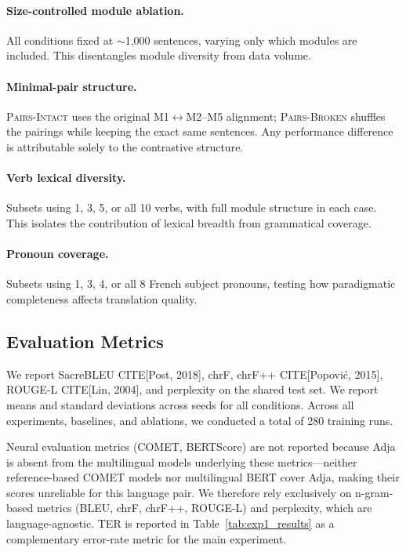 \documentclass[11pt]{article}
\begin{document}
\paragraph{Size-controlled module ablation.} All conditions fixed at ${\sim}$1,000 sentences, varying only which modules are included. This disentangles module diversity from data volume.

\paragraph{Minimal-pair structure.} \textsc{Pairs-Intact} uses the original M1$\leftrightarrow$M2--M5 alignment; \textsc{Pairs-Broken} shuffles the pairings while keeping the exact same sentences. Any performance difference is attributable solely to the contrastive structure.

\paragraph{Verb lexical diversity.} Subsets using 1, 3, 5, or all 10 verbs, with full module structure in each case. This isolates the contribution of lexical breadth from grammatical coverage.

\paragraph{Pronoun coverage.} Subsets using 1, 3, 4, or all 8 French subject pronouns, testing how paradigmatic completeness affects translation quality.

\subsection{Evaluation Metrics}

We report SacreBLEU CITE[Post, 2018], chrF, chrF++ CITE[Popovi\'{c}, 2015], ROUGE-L CITE[Lin, 2004], and perplexity on the shared test set. We report means and standard deviations across seeds for all conditions. Across all experiments, baselines, and ablations, we conducted a total of 280 training runs.

Neural evaluation metrics (COMET, BERTScore) are not reported because Adja is absent from the multilingual models underlying these metrics---neither reference-based COMET models nor multilingual BERT cover Adja, making their scores unreliable for this language pair. We therefore rely exclusively on n-gram-based metrics (BLEU, chrF, chrF++, ROUGE-L) and perplexity, which are language-agnostic. TER is reported in Table~\ref{tab:exp1_results} as a complementary error-rate metric for the main experiment.
\end{document}
